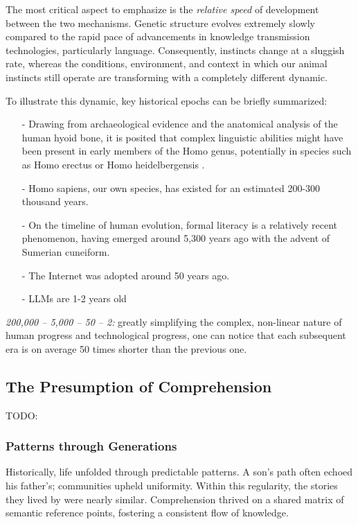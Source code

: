 \documentclass[11pt,a4]{article}
\begin{document}
 \par
    The most critical aspect to emphasize is the \textit{relative speed} of development between the two mechanisms. Genetic structure evolves extremely slowly compared to the rapid pace of advancements in knowledge transmission technologies, particularly language. Consequently, instincts change at a sluggish rate, whereas the conditions, environment, and context in which our animal instincts still operate are transforming with a completely different dynamic.\\
    \par
        To illustrate this dynamic, key historical epochs can be briefly summarized:


        \begin{itemize}
            \item[-] Drawing from archaeological evidence and the anatomical analysis of the human hyoid bone, it is posited that complex linguistic abilities might have been present in early members of the Homo genus, potentially in species such as Homo erectus or Homo heidelbergensis \cite{Capasso2008AHE}.
            \item[-] Homo sapiens, our own species, has existed for an estimated 200-300 thousand years\cite{Vidal}.
            \item[-] On the timeline of human evolution, formal literacy is a relatively recent phenomenon, having emerged around 5,300 years ago with the advent of Sumerian cuneiform\cite{Walker}.
            \item[-] The Internet was adopted around 50 years ago.
            \item[-] LLMs are 1-2 years old
        \end{itemize}


        \textit{200,000 – 5,000 – 50 – 2:}
        greatly simplifying the complex, non-linear nature of human progress and technological progress, one can notice that each subsequent era is on average 50 times shorter than the previous one.



\subsection{The Presumption of Comprehension}
    TODO:

    \subsubsection{Patterns through Generations}
        \par
        Historically, life unfolded through predictable patterns. A son's path often echoed his father's; communities upheld uniformity. Within this regularity, the stories they lived by were nearly similar. Comprehension thrived on a shared matrix of semantic reference points, fostering a consistent flow of knowledge.
\end{document}
